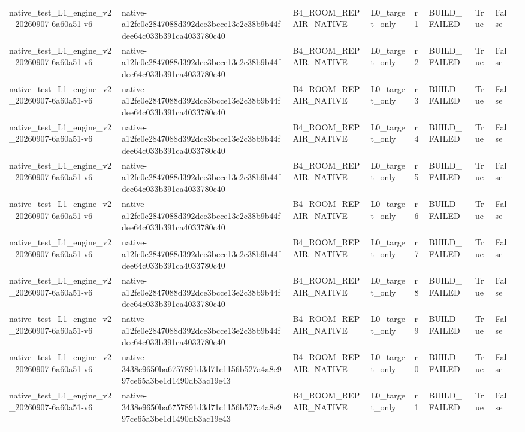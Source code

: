 \begin{tabular}{lllllllll}
native\_test\_L1\_engine\_v2\_20260907-6a60a51-v6 & native-a12fe0e2847088d392dce3bcce13e2c38b9b44fdee64c033b391ca4033780c40 & B4\_ROOM\_REPAIR\_NATIVE & L0\_target\_only & r1 & BUILD\_FAILED & True & False &  \\
native\_test\_L1\_engine\_v2\_20260907-6a60a51-v6 & native-a12fe0e2847088d392dce3bcce13e2c38b9b44fdee64c033b391ca4033780c40 & B4\_ROOM\_REPAIR\_NATIVE & L0\_target\_only & r2 & BUILD\_FAILED & True & False &  \\
native\_test\_L1\_engine\_v2\_20260907-6a60a51-v6 & native-a12fe0e2847088d392dce3bcce13e2c38b9b44fdee64c033b391ca4033780c40 & B4\_ROOM\_REPAIR\_NATIVE & L0\_target\_only & r3 & BUILD\_FAILED & True & False &  \\
native\_test\_L1\_engine\_v2\_20260907-6a60a51-v6 & native-a12fe0e2847088d392dce3bcce13e2c38b9b44fdee64c033b391ca4033780c40 & B4\_ROOM\_REPAIR\_NATIVE & L0\_target\_only & r4 & BUILD\_FAILED & True & False &  \\
native\_test\_L1\_engine\_v2\_20260907-6a60a51-v6 & native-a12fe0e2847088d392dce3bcce13e2c38b9b44fdee64c033b391ca4033780c40 & B4\_ROOM\_REPAIR\_NATIVE & L0\_target\_only & r5 & BUILD\_FAILED & True & False &  \\
native\_test\_L1\_engine\_v2\_20260907-6a60a51-v6 & native-a12fe0e2847088d392dce3bcce13e2c38b9b44fdee64c033b391ca4033780c40 & B4\_ROOM\_REPAIR\_NATIVE & L0\_target\_only & r6 & BUILD\_FAILED & True & False &  \\
native\_test\_L1\_engine\_v2\_20260907-6a60a51-v6 & native-a12fe0e2847088d392dce3bcce13e2c38b9b44fdee64c033b391ca4033780c40 & B4\_ROOM\_REPAIR\_NATIVE & L0\_target\_only & r7 & BUILD\_FAILED & True & False &  \\
native\_test\_L1\_engine\_v2\_20260907-6a60a51-v6 & native-a12fe0e2847088d392dce3bcce13e2c38b9b44fdee64c033b391ca4033780c40 & B4\_ROOM\_REPAIR\_NATIVE & L0\_target\_only & r8 & BUILD\_FAILED & True & False &  \\
native\_test\_L1\_engine\_v2\_20260907-6a60a51-v6 & native-a12fe0e2847088d392dce3bcce13e2c38b9b44fdee64c033b391ca4033780c40 & B4\_ROOM\_REPAIR\_NATIVE & L0\_target\_only & r9 & BUILD\_FAILED & True & False &  \\
native\_test\_L1\_engine\_v2\_20260907-6a60a51-v6 & native-3438e9650ba6757891d3d71c1156b527a4a8e997ce65a3be1d1490db3ac19e43 & B4\_ROOM\_REPAIR\_NATIVE & L0\_target\_only & r0 & BUILD\_FAILED & True & False &  \\
native\_test\_L1\_engine\_v2\_20260907-6a60a51-v6 & native-3438e9650ba6757891d3d71c1156b527a4a8e997ce65a3be1d1490db3ac19e43 & B4\_ROOM\_REPAIR\_NATIVE & L0\_target\_only & r1 & BUILD\_FAILED & True & False &  \\

\end{tabular}
